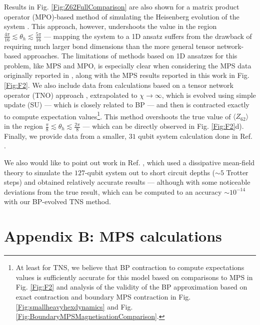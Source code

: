 \documentclass[%
 superscriptaddress,
 amsmath,amssymb,
 prx, nofootinbib,
 twocolumn
]{revtex4-2}
\begin{document}
\par Results in  Fig. \ref{Fig:Z62FullComparison} are also shown for a matrix product operator (MPO)-based method of simulating the Heisenberg evolution of the system \cite{Zalatel2023}. This approach, however, undershoots the value in the region $\frac{4\pi}{16} \lesssim \theta_{h} \lesssim \frac{5\pi}{16}$  --- mapping the system to a 1D ansatz suffers from the drawback of requiring much larger bond dimensions than the more general tensor network-based approaches. The limitations of methods based on 1D ansatzes for this problem, like MPS and MPO, is especially clear when considering the MPS data originally reported in \cite{kim2023}, along with the MPS results reported in this work in Fig. \ref{Fig:F2}. We also include data from calculations based on a tensor network operator (TNO) approach \cite{Liao2023}, extrapolated to $\chi \rightarrow \infty$, which is evolved using simple update (SU) --- which is closely related to BP \cite{Alkabetz2021, TindallGauging2023} --- and then is contracted exactly to compute expectation values\footnote{At least for TNS, we believe that BP contraction to compute expectations values is sufficiently accurate for this model based on comparisons to MPS in Fig. \ref{Fig:F2} and analysis of the validity of the BP approximation based on exact contraction and boundary MPS contraction in Fig. \ref{Fig:smallheavyhexdynamics} and Fig. \ref{Fig:BoundaryMPSMagnetisationComparison}.}. This method overshoots the true value of $\langle Z_{62} \rangle$ in the region $\frac{\pi}{8} \lesssim \theta_{h} \lesssim \frac{2\pi}{8}$  --- which can be directly observed in Fig. \ref{Fig:F2}d). Finally, we provide data from a smaller, $31$ qubit system calculation done in Ref. \cite{kechedzhi2023}.

\par We also would like to point out work in Ref. \cite{torre2023}, which used a dissipative mean-field theory to simulate the $127$-qubit system out to short circuit depths ($\sim 5$ Trotter steps) and obtained relatively accurate results --- although with some noticeable deviations from the true result, which can be computed to an accuracy $\sim 10^{-14}$ with our BP-evolved TNS method. 

\renewcommand{\theequation}{B\arabic{equation}}
\section*{Appendix B: MPS calculations}
\end{document}
